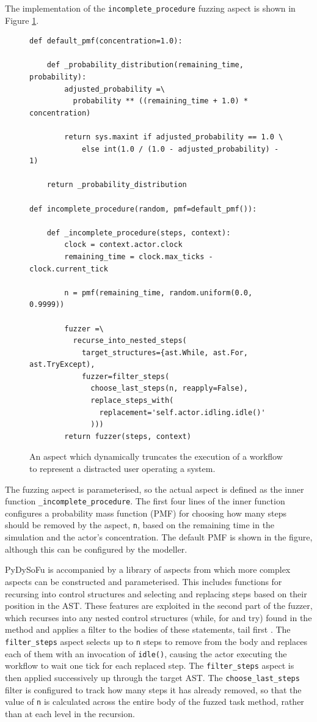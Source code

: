 \documentclass{llncs}
\begin{document}
The implementation of the \lstinline!incomplete_procedure! fuzzing aspect is shown in Figure
\ref{fig:distraction-fuzzer}.%
\begin{figure}[t]
  \centering
\begin{lstlisting}
def default_pmf(concentration=1.0):

    def _probability_distribution(remaining_time, probability):
        adjusted_probability =\
          probability ** ((remaining_time + 1.0) * concentration)

        return sys.maxint if adjusted_probability == 1.0 \
            else int(1.0 / (1.0 - adjusted_probability) - 1)

    return _probability_distribution

def incomplete_procedure(random, pmf=default_pmf()):

    def _incomplete_procedure(steps, context):
        clock = context.actor.clock
        remaining_time = clock.max_ticks - clock.current_tick

        n = pmf(remaining_time, random.uniform(0.0, 0.9999))

        fuzzer =\
          recurse_into_nested_steps(
            target_structures={ast.While, ast.For, ast.TryExcept),
            fuzzer=filter_steps(
              choose_last_steps(n, reapply=False),
              replace_steps_with(
                replacement='self.actor.idling.idle()'
              )))
        return fuzzer(steps, context)
\end{lstlisting}
  \caption{An aspect which dynamically truncates the execution of a workflow to represent a distracted user operating a
    system.}
  \label{fig:distraction-fuzzer}
\end{figure}
The fuzzing aspect is parameterised, so the actual aspect is defined as the inner
function \lstinline!_incomplete_procedure!.  The first four lines of the inner function configures a probability mass
function (PMF) for choosing how many steps should be removed by the aspect, \lstinline!n!, based on the remaining time
in the simulation and the actor's concentration. The default PMF is shown in the figure, although this can be configured
by the modeller.

PyDySoFu is accompanied by a library of aspects from which more complex aspects can be constructed and parameterised.
This includes functions for recursing into control structures and selecting and replacing steps based on their position
in the AST.  These features are exploited in the second part of the fuzzer, which recurses into any nested control
structures (while, for and try) found in the method and applies a filter to the bodies of these statements, tail first .
The \lstinline!filter_steps! aspect selects up to \lstinline!n! steps to remove from the body and replaces each of them
with an invocation of \lstinline!idle()!, causing the actor executing the workflow to wait one tick for each replaced
step.  The \lstinline!filter_steps! aspect is then applied successively up through the target AST.  The
\lstinline!choose_last_steps! filter is configured to track how many steps it has already removed, so that the value of
\lstinline!n! is calculated across the entire body of the fuzzed task method, rather than at each level in the
recursion.
\end{document}
